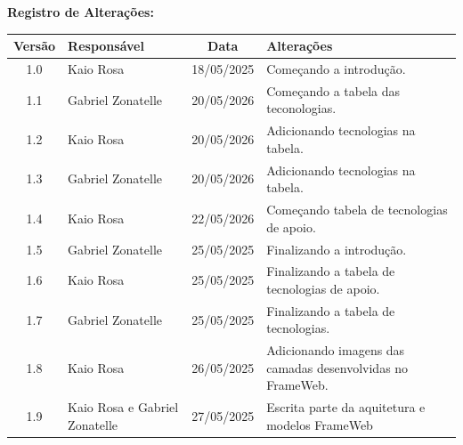 \documentclass[
	12pt,				
	oneside,		
	a4paper,			
	english,			%
	french,				%
	spanish,			%
	brazil				%
	]{abntex2}
\begin{document}
\begin{center}
	{\large\bfseries Registro de Alterações:}
	
	\vspace{0.5cm}
	\begin{tabular}{|c|p{45mm}|c|p{60mm}|} \hline
		
		\textbf{Versão} & \textbf{Responsável} & \textbf{Data}  & \textbf{Alterações} \\ \hline   
		
		1.0 & Kaio Rosa & 18/05/2025 & Começando a introdução. \\\hline
        1.1 & Gabriel Zonatelle & 20/05/2026 & Começando a tabela das teconologias. \\\hline
        1.2 & Kaio Rosa & 20/05/2026 & Adicionando tecnologias na tabela. \\\hline
        1.3 & Gabriel Zonatelle & 20/05/2026 & Adicionando tecnologias na tabela. \\\hline
        1.4 & Kaio Rosa & 22/05/2026 & Começando tabela de tecnologias de apoio. \\\hline
        1.5 & Gabriel Zonatelle & 25/05/2025 & Finalizando a introdução. \\\hline
        1.6 & Kaio Rosa & 25/05/2025 & Finalizando a tabela de tecnologias de apoio. \\\hline
        1.7 & Gabriel Zonatelle & 25/05/2025 & Finalizando a tabela de tecnologias. \\\hline
        1.8 & Kaio Rosa & 26/05/2025 & Adicionando imagens das camadas desenvolvidas no FrameWeb. \\\hline

       1.9 & Kaio Rosa e Gabriel Zonatelle & 27/05/2025 & Escrita parte da aquitetura e modelos FrameWeb \\\hline
	\end{tabular}
    
\end{center}
\newpage



\textual

\begingroup
\let\clearpage\relax


\vspace*{1.5cm}


\vspace*{1.5cm}
\end{document}
